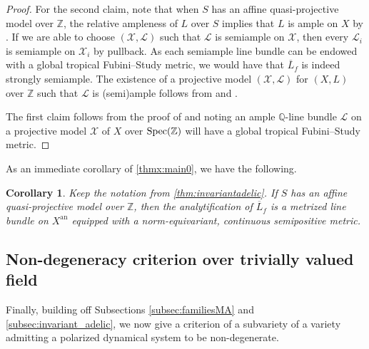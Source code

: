 \documentclass[11pt,reqno]{amsart}
\newcommand{\mZ}{\mathbb{Z}}
\newcommand{\mQ}{\mathbb{Q}}
\newcommand{\cX}{\mathcal{X}}
\newcommand{\cL}{\mathcal{L}}
\theoremstyle{theorem}
\numberwithin{equation}{subsection}
\newtheorem{corollary}[subsubsection]{Corollary}
\numberwithin{equation}{subsection}
\theoremstyle{definition}
\theoremstyle{remark}
\numberwithin{equation}{subsubsection} \numberwithin{figure}{section}
\DeclareMathOperator{\an}{an}
\begin{document}
\begin{proof}
For the second claim, note that when $S$ has an affine quasi-projective model over $\mZ$, the relative ampleness of $L$ over $S$ implies that $L$ is ample on $X$ by \cite[\href{https://stacks.math.columbia.edu/tag/01VK}{Tag 01VK}]{stacks-project}. 
If we are able to choose $(\cX,\cL)$ such that ${\cL}$ is semiample on $\cX$, then every $\cL_i$ is semiample on $\cX_i$ by pullback.
As each semiample line bundle can be endowed with a global tropical Fubini--Study metric, we would have that $\overline{L}_f$ is indeed strongly semiample. 
The existence of a projective model $(\cX,\cL)$ for $(X,L)$ over $\mZ$ such that $\cL$ is (semi)ample follows from \cite[\href{https://stacks.math.columbia.edu/tag/01PZ}{Tag 01PZ}]{stacks-project} and \cite[\href{https://stacks.math.columbia.edu/tag/01Q1}{Tag 01Q1}]{stacks-project}. 


The first claim follows from the proof of \cite[Theorem 6.1.1]{YuanZhang:AdelicLineBundles} and noting an ample $\mQ$-line bundle $\cL$ on a projective model $\cX$ of $X$ over $\Spec(\mZ)$ will have a global tropical Fubini--Study metric. 
\end{proof}

As an immediate corollary of \autoref{thmx:main0}, we have the following. 

\begin{corollary}\label{coro:analytic_invariant_ssa}
Keep the notation from \autoref{thm:invariantadelic}. 
If $S$ has an affine quasi-projective model over $\mZ$, then the analytification of $\overline{L}_f$ is a metrized line bundle on $X^{\an}$  equipped with a norm-equivariant, continuous semipositive metric. 
\end{corollary}

\subsection{Non-degeneracy criterion over trivially valued field}
\label{subsec:Nondegeneracy_trivially}
Finally, building off Subsections \ref{subsec:familiesMA} and \ref{subsec:invariant_adelic}, we now give a criterion of a subvariety of a variety admitting a polarized dynamical system to be non-degenerate. 
\end{document}
